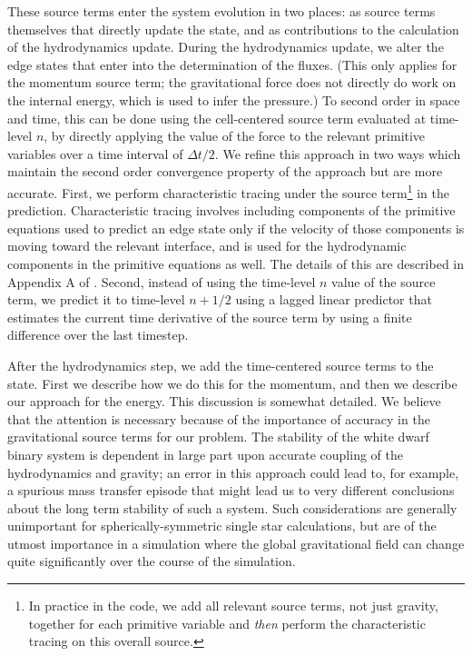 \documentclass[12pt]{article}
\begin{document}
These source terms enter the system evolution in two places: as source terms themselves
that directly update the state, and as contributions to the calculation of the hydrodynamics update.
During the hydrodynamics update, we alter the edge states that enter
into the determination of the fluxes. (This only applies for the momentum source term;
the gravitational force does not directly do work on the internal energy, which is used
to infer the pressure.) To second order in space and time, this can be
done using the cell-centered source term evaluated at time-level $n$, by directly
applying the value of the force to the relevant primitive variables over a
time interval of $\Delta t / 2$. We refine this approach in two ways which maintain
the second order convergence property of the approach but are more accurate. First,
we perform characteristic tracing under the source term\footnote{In practice in the code,
we add all relevant source terms, not just gravity, together for each primitive variable and
\textit{then} perform the characteristic tracing on this overall source.} in the prediction.
Characteristic tracing involves including components of the primitive equations used to predict
an edge state only if the velocity of those components is moving toward the relevant interface,
and is used for the hydrodynamic components in the primitive equations as well.
The details of this are described in Appendix A of \cite{wdmergerI}. Second, instead of using
the time-level $n$ value of the source term, we predict it to time-level $n+1/2$ using a lagged
linear predictor that estimates the current time derivative of the source term by using a
finite difference over the last timestep.

After the hydrodynamics step, we add the time-centered source terms
to the state. First we describe how we do this for the momentum,
and then we describe our approach for the energy. This discussion is somewhat detailed.
We believe that the attention is necessary because of the importance of accuracy
in the gravitational source terms for our problem. The stability of the white dwarf binary
system is dependent in large part upon accurate coupling of the hydrodynamics and gravity;
an error in this approach could lead to, for example, a spurious mass transfer episode
that might lead us to very different conclusions about the long term stability of such a system.
Such considerations are generally unimportant for spherically-symmetric single star calculations,
but are of the utmost importance in a simulation where the global gravitational field can change
quite significantly over the course of the simulation.
\end{document}
